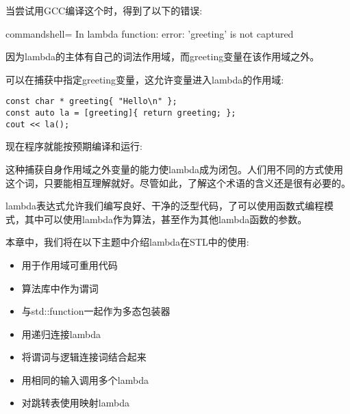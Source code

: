 当尝试用GCC编译这个时，得到了以下的错误:

\begin{tcblisting}{commandshell={}}
In lambda function:
error: 'greeting' is not captured
\end{tcblisting}

因为lambda的主体有自己的词法作用域，而greeting变量在该作用域之外。

可以在捕获中指定greeting变量，这允许变量进入lambda的作用域:

\begin{lstlisting}[style=styleCXX]
const char * greeting{ "Hello\n" };
const auto la = [greeting]{ return greeting; };
cout << la();
\end{lstlisting}

现在程序就能按预期编译和运行:


这种捕获自身作用域之外变量的能力使lambda成为闭包。人们用不同的方式使用这个词，只要能相互理解就好。尽管如此，了解这个术语的含义还是很有必要的。

lambda表达式允许我们编写良好、干净的泛型代码，了可以使用函数式编程模式，其中可以使用lambda作为算法，甚至作为其他lambda函数的参数。

本章中，我们将在以下主题中介绍lambda在STL中的使用:

\begin{itemize}
\item 
用于作用域可重用代码

\item 
算法库中作为谓词

\item 
与std::function一起作为多态包装器

\item 
用递归连接lambda

\item 
将谓词与逻辑连接词结合起来

\item 
用相同的输入调用多个lambda

\item 
对跳转表使用映射lambda
\end{itemize}





